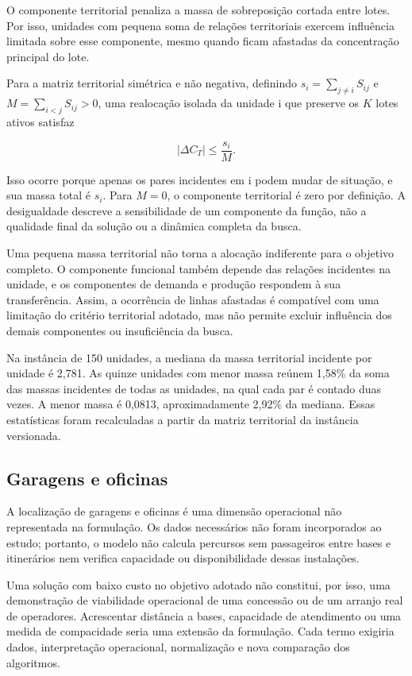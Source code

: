 \documentclass[12pt,a4paper]{article}
\begin{document}
O componente territorial penaliza a massa de sobreposição cortada entre lotes. Por isso,
unidades com pequena soma de relações territoriais exercem influência limitada sobre
esse componente, mesmo quando ficam afastadas da concentração principal do lote.

Para a matriz territorial simétrica e não negativa, definindo \(s_i=\sum_{j\ne
i}S_{ij}\) e \(M=\sum_{i<j}S_{ij}>0\), uma realocação isolada da unidade i que preserve
os $K$ lotes ativos satisfaz

\[
|\Delta C_T|\leq \frac{s_i}{M}.
\]

Isso ocorre porque apenas os pares incidentes em i podem mudar de situação, e sua massa
total é \(s_i\). Para \(M=0\), o componente territorial é zero por definição. A
desigualdade descreve a sensibilidade de um componente da função, não a qualidade final
da solução ou a dinâmica completa da busca.

Uma pequena massa territorial não torna a alocação indiferente para o objetivo completo.
O componente funcional também depende das relações incidentes na unidade, e os
componentes de demanda e produção respondem à sua transferência. Assim, a ocorrência de
linhas afastadas é compatível com uma limitação do critério territorial adotado, mas não
permite excluir influência dos demais componentes ou insuficiência da busca.

Na instância de 150 unidades, a mediana da massa territorial incidente por unidade é
2,781. As quinze unidades com menor massa reúnem 1,58\% da soma das massas incidentes de
todas as unidades, na qual cada par é contado duas vezes. A menor massa é 0,0813,
aproximadamente 2,92\% da mediana. Essas estatísticas foram recalculadas a partir da
matriz territorial da instância versionada.

\subsection{Garagens e oficinas}

A localização de garagens e oficinas é uma dimensão operacional não representada na
formulação. Os dados necessários não foram incorporados ao estudo; portanto, o modelo
não calcula percursos sem passageiros entre bases e itinerários nem verifica capacidade
ou disponibilidade dessas instalações.

Uma solução com baixo custo no objetivo adotado não constitui, por isso, uma
demonstração de viabilidade operacional de uma concessão ou de um arranjo real de
operadores. Acrescentar distância a bases, capacidade de atendimento ou uma medida de
compacidade seria uma extensão da formulação. Cada termo exigiria dados, interpretação
operacional, normalização e nova comparação dos algoritmos.
\end{document}
